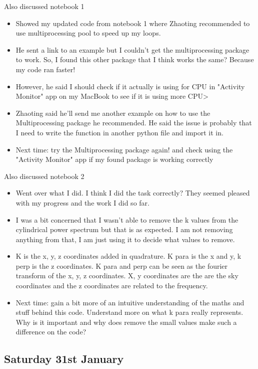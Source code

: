 Also discussed notebook 1 
\begin{itemize}
    \item Showed my updated code from notebook 1 where Zhaoting recommended to use multiprocessing pool to speed up my loops. 
    \item He sent a link to an example but I couldn't get the multiprocessing package to work. So, I found this other package that I think works the same? Because my code ran faster!
    \item However, he said I should check if it actually is using for CPU in "Activity Monitor" app on my MacBook to see if it is using more CPU>
    \item Zhaoting said he'll send me another example on how to use the Multiprocessing package he recommended. He said the issue is probably that I need to write the function in another python file and import it in. 
    \item Next time: try the Multiprocessing package again! and check using the "Activity Monitor" app if my found package is working correctly
\end{itemize}

Also discussed notebook 2
\begin{itemize}
    \item Went over what I did. I think I did the task correctly? They seemed pleased with my progress and the work I did so far.
    \item I was a bit concerned that I wasn't able to remove the k values from the cylindrical power spectrum but that is as expected. I am not removing anything from that, I am just using it to decide what values to remove.
    \item K is the x, y, z coordinates added in quadrature. K para is the x and y, k perp is the z coordinates. K para and perp can be seen as the fourier transform of the x, y, z coordinates. X, y coordinates are the are the sky coordinates and the z coordinates are related to the frequency.
    \item Next time: gain a bit more of an intuitive understanding of the maths and stuff behind this code. Understand more on what k para really represents. Why is it important and why does remove the small values make such a difference on the code?
\end{itemize}

\subsection{Saturday 31st January}


